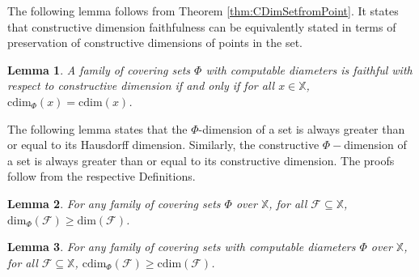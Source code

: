 \documentclass[11pt]{article}
\newtheorem{lemma}{Lemma}
\newcommand{\cdim}{\mathrm{cdim}}
\renewcommand{\dim}{{\mathrm{dim}}}
\newcommand{\F}{{\mathcal{F}}}
\newcommand{\X}{{\mathbb{X}}}
\renewcommand{\F}{\mathcal{F}}
\newcommand{\x}{x}
\begin{document}

The following lemma follows from Theorem \ref{thm:CDimSetfromPoint}.
It states that constructive dimension faithfulness can be equivalently stated in terms of preservation of constructive dimensions of points in the set. 

\begin{lemma}\label{lem:CPhidimSetPoint}
	A family of  covering sets $\Phi$ with computable diameters is
	{faithful with respect to constructive
		dimension} if and only if for all $\x \in \X$, $\cdim_\Phi(\x) =
	\cdim(\x)$.
	
\end{lemma} 


The following lemma states that the $\Phi$-dimension of a set is always greater than or equal to its Hausdorff dimension. Similarly, the constructive $\Phi-$dimension of a set is always greater than or equal to its constructive dimension. The proofs follow from the respective Definitions.

\begin{lemma} \label{lem:PhidimGeqdim}
	For any family of covering sets $\Phi$ over $\X$, for all $\F \subseteq \X$, 
	$\dim_\Phi(\F) \geq \dim(\F)$.
\end{lemma}

\begin{lemma} \label{lem:PhidimGeqCdim}
	For any family of covering sets with computable diameters $\Phi$ over $\X$, for all $\F \subseteq \X$, 
	$\cdim_\Phi(\F) \geq \cdim(\F)$.
\end{lemma}
\end{document}
